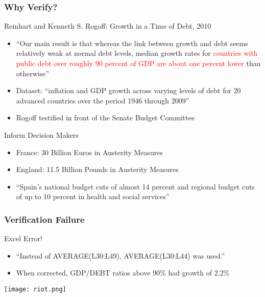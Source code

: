 \documentclass[mathserif]{beamer}
\begin{document}
\begin{frame}
  \frametitle{Why Verify?}
  \begin{block}{Reinhart and Kenneth S. Rogoff: Growth in a Time of Debt, 2010}
    \begin{itemize}
    \item ``Our main result is that whereas the link between growth and
	  debt seems relatively weak at normal debt levels, median
	  growth rates for  \textcolor{red}{countries with public debt
	  over roughly 90 percent of GDP are about one percent lower}
	  than otherwise'' 
     \item Dataset: ``inflation and GDP growth across varying levels
	   of debt for 20 advanced countries over the period 1946
	   through 2009''
     \item Rogoff testified in front of the Senate Budget Committee 
   \end{itemize}
  \end{block}
  \begin{block}{Inform Decision Makers}
    \begin{itemize}
     \item France: 30 Billion Euros in Austerity Measures
     \item England: 11.5 Billion Pounds in Austerity Measures
     \item ``Spain's national budget cuts of almost 14 percent
	   and regional budget cuts of up to 10 percent in health and
	   social services''
    \end{itemize}
  \end{block}
 
\end{frame}

\begin{frame}
  \frametitle{Verification Failure}
  \begin{block}{Excel Error!}
    \begin{itemize}
     \item ``Instead of AVERAGE(L30:L49), AVERAGE(L30:L44) was used.''
     \item When corrected, GDP/DEBT ratios above 90\% had growth of 2.2\%
    \end{itemize}
  \end{block}

 \begin{center}
  \center
  \texttt{[image: riot.png]}\\
 \end{center}
 
\end{frame}
\end{document}
